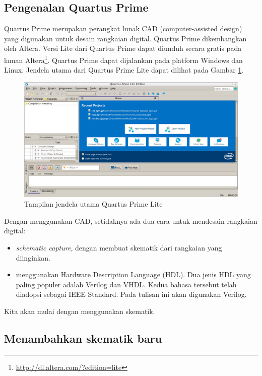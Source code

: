 \subsection{Pengenalan Quartus Prime}

Quartus Prime merupakan perangkat lunak CAD (computer-assisted design)
yang digunakan untuk desain rangkaian digital. Quartus Prime dikembangkan
oleh Altera. Versi Lite dari Quartus Prime dapat diunduh secara gratis
pada laman Altera\footnote{\url{http://dl.altera.com/?edition=lite}}.
Quartus Prime dapat dijalankan pada
platform Windows dan Linux.
Jendela utama dari Quartus Prime Lite dapat dilihat pada Gambar
\ref{fig:main_window}.

\begin{figure}
\centering
\includegraphics[width=\textwidth]{images/FirstOpen.png}
\par
\caption{Tampilan jendela utama Quartus Prime Lite}\label{fig:main_window}
\end{figure}

Dengan menggunakan CAD, setidaknya ada dua cara untuk
mendesain rangkaian digital:
\begin{itemize}
\item \textit{schematic capture}, dengan membuat skematik dari rangkaian yang
diinginkan.
\item menggunakan Hardware Description Language (HDL).
Dua jenis HDL yang paling populer adalah Verilog dan VHDL.
Kedua bahasa tersebut telah diadopsi sebagai IEEE Standard.
Pada tulisan ini akan digunakan Verilog.
\end{itemize}

Kita akan mulai dengan menggunakan skematik.

\subsection{Menambahkan skematik baru}


